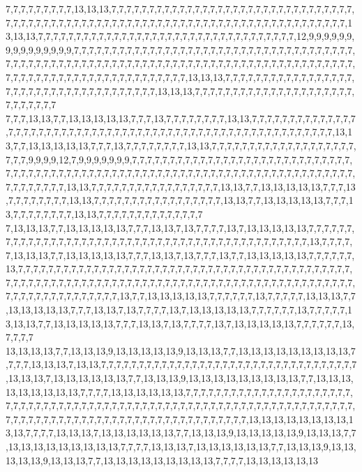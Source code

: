 7,7,7,7,7,7,7,7,7,13,13,13,7,7,7,7,7,7,7,7,7,7,7,7,7,7,7,7,7,7,7,7,7,7,7,7,7,7,7,7,7,7,7,7,7,7,7,7,7,7,7,7,7,7,7,7,7,7,7,7,7,7,7,7,7,7,7,7,7,7,7,7,7,7,7,7,7,7,7,7,7,7,7,7,7,7,7,7,7,13,13,13,7,7,7,7,7,7,7,7,7,7,7,7,7,7,7,7,7,7,7,7,7,7,7,7,7,7,7,7,7,7,7,7,7,7,12,9,9,9,9,9,9,9,9,9,9,9,9,9,9,9,7,7,7,7,7,7,7,7,7,7,7,7,7,7,7,7,7,7,7,7,7,7,7,7,7,7,7,7,7,7,7,7,7,7,7,7,7,7,7,7,7,7,7,7,7,7,7,7,7,7,7,7,7,7,7,7,7,7,7,7,7,7,7,7,7,7,7,7,7,7,7,7,7,7,7,7,7,7,7,7,7,7,7,7,7,7,7,7,7,7,7,7,7,7,7,7,7,7,7,7,7,7,7,7,7,7,7,13,13,13,7,7,7,7,7,7,7,7,7,7,7,7,7,7,7,7,7,7,7,7,7,7,7,7,7,7,7,7,7,7,7,7,7,7,7,7,7,13,13,13,7,7,7,7,7,7,7,7,7,7,7,7,7,7,7,7,7,7,7,7,7,7,7,7,7,7,7,7
7,7,7,13,13,7,7,13,13,13,13,13,7,7,7,13,7,7,7,7,7,7,7,7,13,13,7,7,7,7,7,7,7,7,7,7,7,7,7,7,7,7,7,7,7,7,7,7,7,7,7,7,7,7,7,7,7,7,7,7,7,7,7,7,7,7,7,7,7,7,7,7,7,7,7,7,7,7,7,7,7,7,7,13,13,7,7,13,13,13,13,13,7,7,7,13,7,7,7,7,7,7,7,7,13,13,7,7,7,7,7,7,7,7,7,7,7,7,7,7,7,7,7,7,7,7,7,7,9,9,9,9,12,7,9,9,9,9,9,9,9,7,7,7,7,7,7,7,7,7,7,7,7,7,7,7,7,7,7,7,7,7,7,7,7,7,7,7,7,7,7,7,7,7,7,7,7,7,7,7,7,7,7,7,7,7,7,7,7,7,7,7,7,7,7,7,7,7,7,7,7,7,7,7,7,7,7,7,7,7,7,7,7,7,7,7,7,7,7,7,7,7,7,7,13,13,7,7,7,7,7,7,7,7,7,7,7,7,7,7,7,7,7,13,13,7,7,13,13,13,13,13,7,7,7,13,7,7,7,7,7,7,7,7,13,13,7,7,7,7,7,7,7,7,7,7,7,7,7,7,7,7,7,13,13,7,7,13,13,13,13,13,7,7,7,13,7,7,7,7,7,7,7,7,13,13,7,7,7,7,7,7,7,7,7,7,7,7,7,7
7,13,13,13,7,7,13,13,13,13,13,7,7,7,13,13,7,13,7,7,7,7,13,7,13,13,13,13,13,7,7,7,7,7,7,7,7,7,7,7,7,7,7,7,7,7,7,7,7,7,7,7,7,7,7,7,7,7,7,7,7,7,7,7,7,7,7,7,7,7,7,7,7,7,7,13,7,7,7,7,7,13,13,13,7,7,13,13,13,13,13,7,7,7,13,13,7,13,7,7,7,13,7,7,13,13,13,13,13,7,7,7,7,7,7,13,7,7,7,7,7,7,7,7,7,7,7,7,7,7,7,7,7,7,7,7,7,7,7,7,7,7,7,7,7,7,7,7,7,7,7,7,7,7,7,7,7,7,7,7,7,7,7,7,7,7,7,7,7,7,7,7,7,7,7,7,7,7,7,7,7,7,7,7,7,7,7,7,7,7,7,7,7,7,7,7,7,7,7,7,7,7,7,7,7,7,7,7,7,7,7,7,7,7,7,7,7,7,7,7,7,13,7,7,13,13,13,13,13,7,7,7,7,7,7,13,7,7,7,7,7,13,13,13,7,7,13,13,13,13,13,7,7,7,13,13,7,13,7,7,7,7,13,7,13,13,13,13,13,7,7,7,7,7,7,13,7,7,7,7,7,13,13,13,7,7,13,13,13,13,13,7,7,7,13,13,7,13,7,7,7,7,13,7,13,13,13,13,13,7,7,7,7,7,7,13,7,7,7,7
13,13,13,13,7,7,13,13,13,9,13,13,13,13,13,9,13,13,13,7,7,13,13,13,13,13,13,13,13,13,7,7,7,7,13,13,13,7,13,13,7,7,7,7,7,7,7,7,7,7,7,7,7,7,7,7,7,7,7,7,7,7,7,7,7,7,7,7,7,7,7,7,7,7,13,13,13,7,13,13,13,13,13,13,7,7,13,13,13,9,13,13,13,13,13,13,13,13,13,7,7,13,13,13,13,13,13,13,13,13,7,7,7,7,13,13,13,13,13,13,7,7,7,7,7,7,7,7,7,7,7,7,7,7,7,7,7,7,7,7,7,7,7,7,7,7,7,7,7,7,7,7,7,7,7,7,7,7,7,7,7,7,7,7,7,7,7,7,7,7,7,7,7,7,7,7,7,7,7,7,7,7,7,7,7,7,7,7,7,7,7,7,7,7,7,7,7,7,7,7,7,7,7,7,7,7,7,7,7,7,7,7,7,7,7,7,7,7,7,7,13,13,13,13,13,13,13,13,13,13,7,7,7,7,13,13,13,7,13,13,13,13,13,13,7,7,13,13,13,9,13,13,13,13,13,9,13,13,13,7,7,13,13,13,13,13,13,13,13,13,7,7,7,7,13,13,13,7,13,13,13,13,13,13,7,7,13,13,13,9,13,13,13,13,13,9,13,13,13,7,7,13,13,13,13,13,13,13,13,13,7,7,7,7,13,13,13,13,13,13
